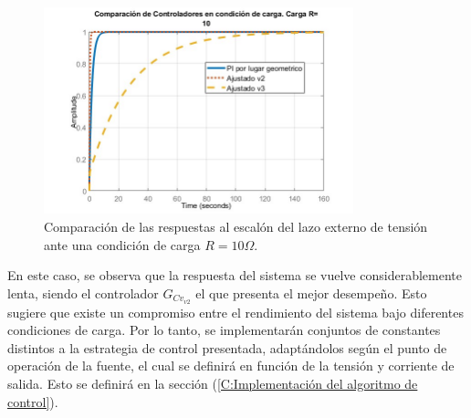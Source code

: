 \begin{figure} [H]
	\centering
	\includegraphics[width=0.8\textwidth]{./imagenes/Resp_lazo_tension_carga.jpg}
	\caption{Comparación de las respuestas al escalón del lazo externo de tensión ante una condición de carga $R=10\Omega$.}
	\label{F:Resp_lazo_tension_carga}
\end{figure} \par 
En este caso, se observa que la respuesta del sistema se vuelve considerablemente lenta, siendo el controlador $G_{Cv_{v2}}$ el que presenta el mejor desempeño. Esto sugiere que existe un compromiso entre el rendimiento del sistema bajo diferentes condiciones de carga. Por lo tanto, se implementarán conjuntos de constantes distintos a la estrategia de control presentada, adaptándolos según el punto de operación de la fuente, el cual se definirá en función de la tensión y corriente de salida. Esto se definirá en la sección  (\ref{C:Implementación del algoritmo de control}).\par

